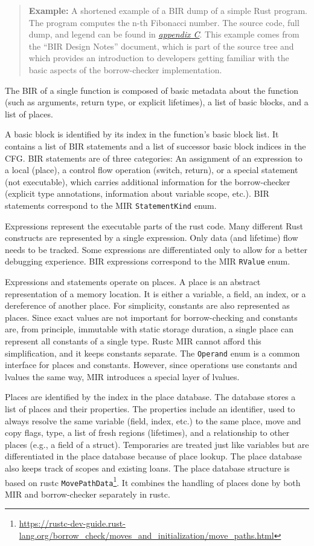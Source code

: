 \documentclass[
  11pt,
  twoside,symmetric]{report}
\DeclareRobustCommand{\href}[2]{#2\footnote{\url{#1}}}
\begin{document}
\begin{quote}
\textbf{Example:} A shortened example of a BIR dump of a simple Rust
program. The program computes the n-th Fibonacci number. The source
code, full dump, and legend can be found in
\protect\hyperlink{appendix-c-bir-dump-example}{\emph{appendix C}}. This
example comes from the ``BIR Design Notes'' document, which is part of
the source tree and which provides an introduction to developers getting
familiar with the basic aspects of the borrow-checker implementation.
\end{quote}

The BIR of a single function is composed of basic metadata about the
function (such as arguments, return type, or explicit lifetimes), a list
of basic blocks, and a list of places.

A basic block is identified by its index in the function's basic block
list. It contains a list of BIR statements and a list of successor basic
block indices in the CFG. BIR statements are of three categories: An
assignment of an expression to a local (place), a control flow operation
(switch, return), or a special statement (not executable), which carries
additional information for the borrow-checker (explicit type
annotations, information about variable scope, etc.). BIR statements
correspond to the MIR \texttt{StatementKind} enum.

Expressions represent the executable parts of the rust code. Many
different Rust constructs are represented by a single expression. Only
data (and lifetime) flow needs to be tracked. Some expressions are
differentiated only to allow for a better debugging experience. BIR
expressions correspond to the MIR \texttt{RValue} enum.

Expressions and statements operate on places. A place is an abstract
representation of a memory location. It is either a variable, a field,
an index, or a dereference of another place. For simplicity, constants
are also represented as places. Since exact values are not important for
borrow-checking and constants are, from principle, immutable with static
storage duration, a single place can represent all constants of a single
type. Rustc MIR cannot afford this simplification, and it keeps
constants separate. The \texttt{Operand} enum is a common interface for
places and constants. However, since operations use constants and
lvalues the same way, MIR introduces a special layer of lvalues.

Places are identified by the index in the place database. The database
stores a list of places and their properties. The properties include an
identifier, used to always resolve the same variable (field, index,
etc.) to the same place, move and copy flags, type, a list of fresh
regions (lifetimes), and a relationship to other places (e.g., a field
of a struct). Temporaries are treated just like variables but are
differentiated in the place database because of place lookup. The place
database also keeps track of scopes and existing loans. The place
database structure is based on rustc
\href{https://rustc-dev-guide.rust-lang.org/borrow_check/moves_and_initialization/move_paths.html}{\texttt{MovePathData}}.
It combines the handling of places done by both MIR and borrow-checker
separately in rustc.
\end{document}
